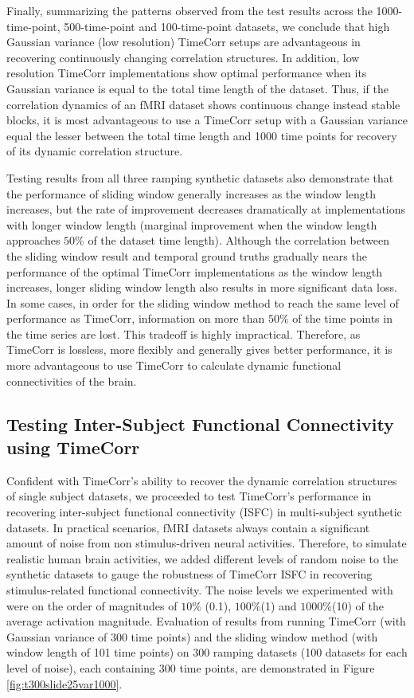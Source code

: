 \documentclass[11pt]{article}
\begin{document}
Finally, summarizing the patterns observed from the test results across the 1000-time-point, 500-time-point and 100-time-point datasets, we conclude that high Gaussian variance (low resolution) TimeCorr setups are advantageous in recovering continuously changing correlation structures. In addition, low resolution TimeCorr implementations show optimal performance when its Gaussian variance is equal to the total time length of the dataset. Thus, if the correlation dynamics of an fMRI dataset shows continuous change instead stable blocks, it is most advantageous to use a TimeCorr setup with a Gaussian variance equal the lesser between the total time length and 1000 time points for recovery of its dynamic correlation structure.

Testing results from all three ramping synthetic datasets also demonstrate that the performance of sliding window generally increases as the window length increases, but the rate of improvement decreases dramatically at implementations with longer window length (marginal improvement when the window length approaches $50\%$ of the dataset time length). Although the correlation between the sliding window result and temporal ground truths gradually nears the performance of the optimal TimeCorr implementations as the window length increases, longer sliding window length also results in more significant data loss. In some cases, in order for the sliding window method to reach the same level of performance as TimeCorr, information on more than $50\%$ of the time points in the time series are lost. This tradeoff is highly impractical. Therefore, as TimeCorr is lossless, more flexibly and generally gives better performance, it is more advantageous to use TimeCorr to calculate dynamic functional connectivities of the brain.

\subsection{Testing Inter-Subject Functional Connectivity using TimeCorr}
Confident with TimeCorr's ability to recover the dynamic correlation structures of single subject datasets, we proceeded to test TimeCorr's performance in recovering inter-subject functional connectivity (ISFC) in multi-subject synthetic datasets. In practical scenarios, fMRI datasets always contain a significant amount of noise from non stimulus-driven neural activities. Therefore, to simulate realistic human brain activities, we added different levels of random noise to the synthetic datasets to gauge the robustness of TimeCorr ISFC in recovering stimulus-related functional connectivity. The noise levels we experimented with were on the order of magnitudes of $10\%$ (0.1), $100\%$(1) and $1000\%$(10) of the average activation magnitude. Evaluation of results from running TimeCorr (with Gaussian variance of 300 time points) and the sliding window method (with window length of 101 time points) on 300 ramping datasets (100 datasets for each level of noise), each containing 300 time points, are demonstrated in Figure \ref{fig:t300slide25var1000}.
\end{document}
